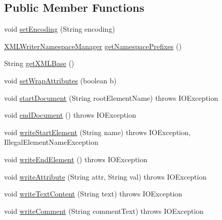 \subsection*{Public Member Functions}
\begin{DoxyCompactItemize}
\item 
void \hyperlink{interfaceorg_1_1coode_1_1xml_1_1_x_m_l_writer_a786b1ff3681daadeb283b7e7ddc5bad9}{set\-Encoding} (String encoding)
\item 
\hyperlink{classorg_1_1coode_1_1xml_1_1_x_m_l_writer_namespace_manager}{X\-M\-L\-Writer\-Namespace\-Manager} \hyperlink{interfaceorg_1_1coode_1_1xml_1_1_x_m_l_writer_a4e08147a76afae4ce434117dcc27b4a0}{get\-Namespace\-Prefixes} ()
\item 
String \hyperlink{interfaceorg_1_1coode_1_1xml_1_1_x_m_l_writer_afadb2dde862798ebdabc931db3e34873}{get\-X\-M\-L\-Base} ()
\item 
void \hyperlink{interfaceorg_1_1coode_1_1xml_1_1_x_m_l_writer_afb11f0c1399782ce6dbf29002c482c00}{set\-Wrap\-Attributes} (boolean b)
\item 
void \hyperlink{interfaceorg_1_1coode_1_1xml_1_1_x_m_l_writer_aae45cf3b1edaac63449df6c59876d759}{start\-Document} (String root\-Element\-Name)  throws I\-O\-Exception
\item 
void \hyperlink{interfaceorg_1_1coode_1_1xml_1_1_x_m_l_writer_a6104616d16b949f7ac4efff4d4a9cc50}{end\-Document} ()  throws I\-O\-Exception
\item 
void \hyperlink{interfaceorg_1_1coode_1_1xml_1_1_x_m_l_writer_ab4a575b480d0198349ea64a91e5b3fd5}{write\-Start\-Element} (String name)  throws I\-O\-Exception, Illegal\-Element\-Name\-Exception
\item 
void \hyperlink{interfaceorg_1_1coode_1_1xml_1_1_x_m_l_writer_a07d53f42ed4c3ccb05f4278b1c53e58e}{write\-End\-Element} ()  throws I\-O\-Exception
\item 
void \hyperlink{interfaceorg_1_1coode_1_1xml_1_1_x_m_l_writer_a10ad97f4ef0fa12476e83fd70efe6599}{write\-Attribute} (String attr, String val)  throws I\-O\-Exception
\item 
void \hyperlink{interfaceorg_1_1coode_1_1xml_1_1_x_m_l_writer_a8968d9bf21b4ce904c9efd2c47b23556}{write\-Text\-Content} (String text)  throws I\-O\-Exception
\item 
void \hyperlink{interfaceorg_1_1coode_1_1xml_1_1_x_m_l_writer_a4fee31cbdaae15daf63c1712b9d3412f}{write\-Comment} (String comment\-Text)  throws I\-O\-Exception
\end{DoxyCompactItemize}


